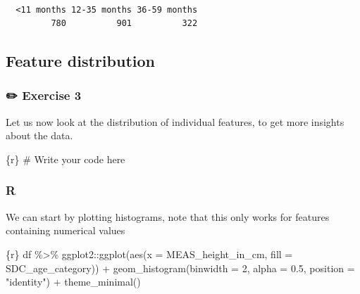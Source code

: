 \documentclass[
  letterpaper,
  DIV=11,
  numbers=noendperiod,
  oneside]{scrreprt}
\newenvironment{Shaded}{\begin{snugshade}}{\end{snugshade}}
\newcommand{\AttributeTok}[1]{\textcolor[rgb]{0.40,0.45,0.13}{#1}}
\newcommand{\CommentTok}[1]{\textcolor[rgb]{0.37,0.37,0.37}{#1}}
\newcommand{\DecValTok}[1]{\textcolor[rgb]{0.68,0.00,0.00}{#1}}
\newcommand{\FloatTok}[1]{\textcolor[rgb]{0.68,0.00,0.00}{#1}}
\newcommand{\FunctionTok}[1]{\textcolor[rgb]{0.28,0.35,0.67}{#1}}
\newcommand{\InformationTok}[1]{\textcolor[rgb]{0.37,0.37,0.37}{#1}}
\newcommand{\NormalTok}[1]{\textcolor[rgb]{0.00,0.23,0.31}{#1}}
\newcommand{\SpecialCharTok}[1]{\textcolor[rgb]{0.37,0.37,0.37}{#1}}
\newcommand{\StringTok}[1]{\textcolor[rgb]{0.13,0.47,0.30}{#1}}
\begin{document}
\begin{verbatim}

  <11 months 12-35 months 36-59 months 
         780          901          322 
\end{verbatim}

\hypertarget{feature-distribution}{%
\subsection{Feature distribution}\label{feature-distribution}}

\subsubsection{\texorpdfstring{{✏️} Exercise 3}{✏️ Exercise 3}}

Let us now look at the distribution of individual features, to get more
insights about the data.

\begin{Shaded}
\begin{Highlighting}[]
\InformationTok{\textasciigrave{}\textasciigrave{}\textasciigrave{}\{r\}}
\CommentTok{\# Write your code here}
\InformationTok{\textasciigrave{}\textasciigrave{}\textasciigrave{}}
\end{Highlighting}
\end{Shaded}

\subsubsection{R}

We can start by plotting histograms, note that this only works for
features containing numerical values

\begin{Shaded}
\begin{Highlighting}[]
\InformationTok{\textasciigrave{}\textasciigrave{}\textasciigrave{}\{r\}}
\NormalTok{df }\SpecialCharTok{\%\textgreater{}\%}\NormalTok{  ggplot2}\SpecialCharTok{::}\FunctionTok{ggplot}\NormalTok{(}\FunctionTok{aes}\NormalTok{(}\AttributeTok{x =}\NormalTok{ MEAS\_height\_in\_cm,}
                            \AttributeTok{fill =}\NormalTok{ SDC\_age\_category)) }\SpecialCharTok{+}
  \FunctionTok{geom\_histogram}\NormalTok{(}\AttributeTok{binwidth =} \DecValTok{2}\NormalTok{, }\AttributeTok{alpha =} \FloatTok{0.5}\NormalTok{, }\AttributeTok{position =} \StringTok{"identity"}\NormalTok{) }\SpecialCharTok{+}
  \FunctionTok{theme\_minimal}\NormalTok{()}
\InformationTok{\textasciigrave{}\textasciigrave{}\textasciigrave{}}
\end{Highlighting}
\end{Shaded}
\end{document}
